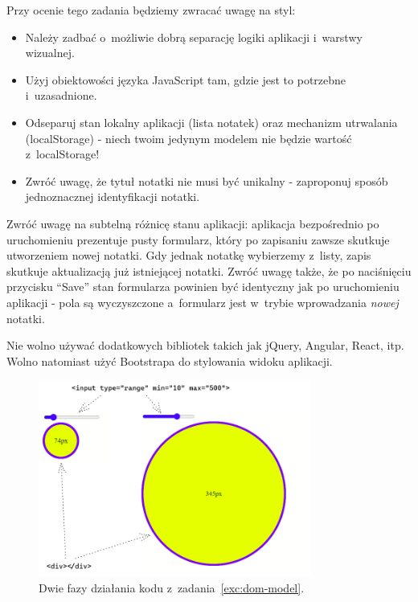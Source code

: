 \documentclass[12pt]{article}
\begin{document}
\begin{enumerate}
            Przy ocenie tego zadania będziemy zwracać uwagę na styl:
            \begin{itemize}
                \item Należy zadbać o~możliwie dobrą separację logiki aplikacji i~warstwy wizualnej.
                \item Użyj obiektowości języka JavaScript tam, gdzie jest to potrzebne i~uzasadnione.
                \item Odseparuj stan lokalny aplikacji (lista notatek) oraz mechanizm utrwalania (localStorage) - niech twoim jedynym modelem nie będzie wartość z~localStorage!
                \item Zwróć uwagę, że tytuł notatki nie musi być unikalny - zaproponuj sposób jednoznacznej identyfikacji notatki.
            \end{itemize}

            Zwróć uwagę na subtelną różnicę stanu aplikacji: aplikacja bezpośrednio po uruchomieniu prezentuje pusty formularz, który po zapisaniu zawsze skutkuje utworzeniem nowej notatki. Gdy jednak notatkę wybierzemy z~listy, zapis skutkuje aktualizacją już istniejącej notatki.
            Zwróć uwagę także, że po naciśnięciu przycisku ``Save'' stan formularza powinien być identyczny jak po uruchomieniu aplikacji - pola są wyczyszczone a~formularz jest w~trybie wprowadzania \emph{nowej} notatki.

            Nie wolno używać dodatkowych bibliotek takich jak jQuery, Angular, React, itp. Wolno natomiast użyć Bootstrapa do stylowania widoku aplikacji.

            \begin{figure}[p]
                \centering
                \includegraphics[width=0.8\textwidth]{lista-2-1}
                \caption{Dwie fazy działania kodu z~zadania~\ref{exc:dom-model}.}
                \label{fig:dom-model}
            \end{figure}


\end{enumerate}
\end{document}

